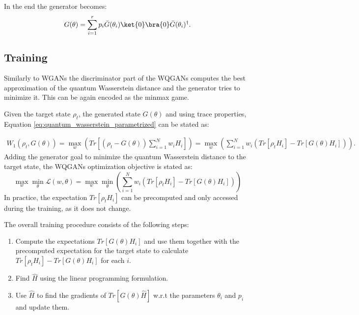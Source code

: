 In the end the generator becomes:
\begin{equation}
  G(\theta) = \sum_{i=1}^r p_i\bar{G}(\theta_i)\ket{0}\bra{0}\bar{G}(\theta_i)^\dagger.
\end{equation}



\subsection{Training}
Similarly to WGANs the discriminator part of the WQGANs computes the best
approximation of the quantum Wasserstein distance and the generator tries to
minimize it. This can be again encoded as the minmax game.

Given the target state $\rho_t$, the generated state $G(\theta)$ and using trace
properties, Equation \eqref{eq:quantum_wasserstein_parametrized} can be stated as:

\begin{equation}
  \label{eq:quantum_wasserstein_separated_trace}
  \begin{split}
    W_1(\rho_t, G(\theta)) = \max_{w}{(Tr[(\rho_t - G(\theta))\sum_{i=1}^N w_iH_i])} = \max_{w}{(\sum_{i=1}^Nw_i(Tr[\rho_tH_i] - Tr[G(\theta)H_i]))}.
  \end{split}
\end{equation}
Adding the generator goal to minimize the quantum Wasserstein distance to the target
state, the WQGANs optimization objective is stated as:
\begin{equation}
  \max_{w}{\min_{\theta}{\mathcal{L}(w, \theta)}} = \max_{w}{\min_{\theta}{(\sum_{i=1}^Nw_i(Tr[\rho_tH_i] - Tr[G(\theta)H_i]))}} 
  \label{eq:wqgans_optimization_objective}
\end{equation}
In practice, the expectation $Tr[\rho_tH_i]$ can be precomputed and only
accessed during the training, as it does not change.

The overall training procedure consists of the following steps:
\begin{enumerate}
\item Compute the expectations $Tr[G(\theta)H_i]$ and use them together with
  the precomputed expectation for the target state to calculate $Tr[\rho_tH_i] -
  Tr[G(\theta)H_i]$ for each $i$.
\item Find $\hat{H}$ using the linear programming formulation.
\item Use $\hat{H}$ to find the gradients of $Tr[G(\theta)\hat{H}]$ w.r.t the parameters
  $\theta_i$ and $p_i$ and update them.
\end{enumerate}

